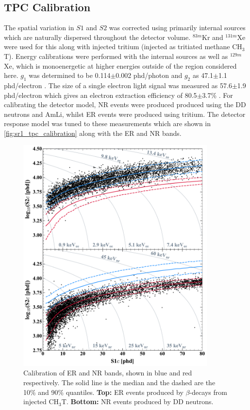 \subsection{TPC Calibration}
\par
The spatial variation in $S1$ and $S2$ was corrected using primarily internal sources which are naturally dispersed throughout the detector volume.
${}^{83m}$Kr and ${}^{131m}$Xe were used for this along with injected tritium (injected as tritiated methane CH$_3$T).
Energy calibrations were performed with the internal sources as well as ${}^{129m}$Xe, which is monoenergetic at higher energies outside of the region considered here.
$g_1$ was determined to be 0.114$\pm$0.002 phd/photon and $g_2$ as 47.1$\pm$1.1 phd/electron \cite{lz_ws_sr1_ref}.
The size of a single electron light signal was measured as 57.6$\pm$1.9 phd/electron which gives an electron extraction efficiency of 80.5$\pm$3.7\% \cite{lz_ws_sr1_ref}.
For calibrating the detector model, NR events were produced produced using the DD neutrons and AmLi, whilst ER events were produced using tritium.
The detector response model was tuned to these measurements which are shown in \autoref{fig:sr1_tpc_calibration} along with the ER and NR bands.
\begin{figure}
    \centering
    \includegraphics[width=10cm]{Figures/EFT/All_SR1_Plots/SR1WS_calOnly_0629_twoPanel.pdf}
    \caption{Calibration of ER and NR bands, shown in blue and red respectively.
             The solid line is the median and the dashed are the 10\% and 90\% quantiles.
             \textbf{Top:} ER events produced by $\beta$-decays from injected CH$_3$T.
             \textbf{Bottom:} NR events produced by DD neutrons.
             }
    \label{fig:sr1_tpc_calibration}
\end{figure}

